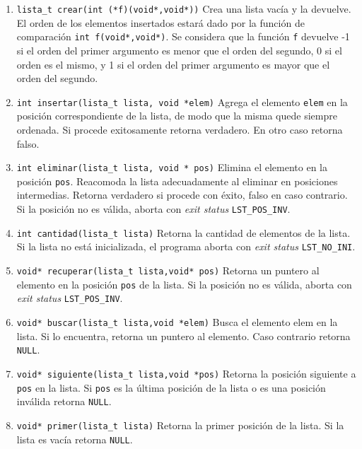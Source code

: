 \documentclass[12pt,a4paper]{article}
\begin{document}
\begin{enumerate}
	
	\item \texttt{lista\_t  crear(int (*f)(void*,void*))} Crea una lista vacía y la devuelve. El orden de los elementos insertados estará dado por la función de comparación \texttt{int f(void*,void*)}. Se considera que la función \texttt{f} devuelve -1 si el orden del primer argumento es menor que el orden del segundo, 0 si el orden es el mismo, y 1 si el orden del primer argumento es mayor que el orden del segundo.
	
	\item \texttt{int insertar(lista\_t lista,  void *elem)}
	Agrega el elemento \texttt{elem} en la posición correspondiente de la lista, de modo que la misma quede siempre ordenada.
	Si procede exitosamente retorna verdadero. En otro caso retorna falso.
	
	\item \texttt{int eliminar(lista\_t lista, void * pos)} Elimina
	el elemento en la posición \texttt{pos}. Reacomoda la lista adecuadamente
	al eliminar en posiciones intermedias. Retorna verdadero si procede con
	éxito, falso en caso contrario. Si la posición no es válida, aborta con
	\emph{exit status} \texttt{LST\_POS\_INV}.
	
	\item \texttt{int cantidad(lista\_t lista)} Retorna la cantidad de
	elementos de la lista. Si la lista no está inicializada, el programa aborta
	con \emph{exit status} \texttt{LST\_NO\_INI}.
	
	\item \texttt{void* recuperar(lista\_t lista,void* pos)} Retorna
	un puntero al elemento en la posición \texttt{pos} de la lista. Si la posición no es
	válida, aborta con \emph{exit status} \texttt{LST\_POS\_INV}.
	
	\item \texttt{void* buscar(lista\_t lista,void *elem)} Busca el elemento elem 
	en la lista. Si lo encuentra, retorna un puntero al elemento. Caso contrario 
	retorna \texttt{NULL}.
	
	\item \texttt{void* siguiente(lista\_t lista,void *pos)} Retorna la posición siguiente a \texttt{pos} 
	en la lista. Si \texttt{pos} es la última posición de la lista o es una posición inválida retorna \texttt{NULL}.

	\item \texttt{void* primer(lista\_t lista)} Retorna la primer posición de la lista. Si la lista es vacía retorna \texttt{NULL}.


\end{enumerate}
\end{document}
